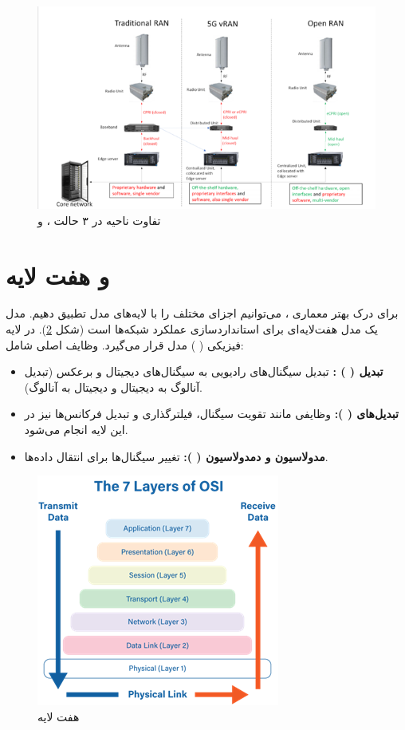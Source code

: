 \documentclass[landscape, 12pt]{report}
\begin{document}
\begin{figure}[ht]
	\centering
	\includegraphics[width=.6\linewidth]{Pic/RAN_Area}
	\caption{تفاوت ناحیه 
		  در ۳ حالت
		   ،
		      و
		        }
	\label{fig:RAN_Area}
\end{figure}


\section*{
و
هفت لایه
}
برای درک بهتر معماری
 ، می‌توانیم اجزای مختلف
   را با لایه‌های مدل
    تطبیق دهیم. مدل
      یک مدل هفت‌لایه‌ای برای استانداردسازی عملکرد شبکه‌ها است (شکل \ref{fig:OSI7Layer}).
      در لایه فیزیکی (
      ) مدل
        قرار می‌گیرد. وظایف اصلی
         شامل:
\begin{itemize}
\item
\textbf{ تبدیل
  (
  )
  :}
تبدیل سیگنال‌های رادیویی به سیگنال‌های دیجیتال و برعکس (تبدیل آنالوگ به دیجیتال و دیجیتال به آنالوگ).
\item 
\textbf{تبدیل‌های
  (
  ): }
وظایفی مانند تقویت سیگنال، فیلترگذاری و تبدیل فرکانس‌ها نیز در این لایه انجام می‌شود.
\item 
\textbf{مدولاسیون و دمدولاسیون
  (
  ):}
تغییر سیگنال‌ها برای انتقال داده‌ها. 
\end{itemize}
     \begin{figure}[ht]
     	\centering
     	\includegraphics[height=.3\linewidth]{Pic/OSI7Layer}
     	\caption{هفت لایه
     	}
     	\label{fig:OSI7Layer}
     \end{figure}
     
\end{document}
